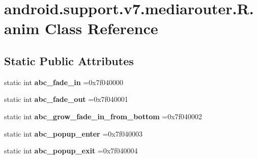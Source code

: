 \hypertarget{classandroid_1_1support_1_1v7_1_1mediarouter_1_1R_1_1anim}{}\section{android.\+support.\+v7.\+mediarouter.\+R.\+anim Class Reference}
\label{classandroid_1_1support_1_1v7_1_1mediarouter_1_1R_1_1anim}
\subsection*{Static Public Attributes}
\begin{DoxyCompactItemize}
\item 
\mbox{\label{classandroid_1_1support_1_1v7_1_1mediarouter_1_1R_1_1anim_ad2e42a8883a370e6cacf5646f5ca963a}} 
static int {\bfseries abc\+\_\+fade\+\_\+in} =0x7f040000
\item 
\mbox{\label{classandroid_1_1support_1_1v7_1_1mediarouter_1_1R_1_1anim_a5cccdc5731a40057ce870b0f9f0d9ac4}} 
static int {\bfseries abc\+\_\+fade\+\_\+out} =0x7f040001
\item 
\mbox{\label{classandroid_1_1support_1_1v7_1_1mediarouter_1_1R_1_1anim_aa69c2db82be247aa2aa32da27296b6b9}} 
static int {\bfseries abc\+\_\+grow\+\_\+fade\+\_\+in\+\_\+from\+\_\+bottom} =0x7f040002
\item 
\mbox{\label{classandroid_1_1support_1_1v7_1_1mediarouter_1_1R_1_1anim_a1c16f4318822b1ebb0319e7a7c702081}} 
static int {\bfseries abc\+\_\+popup\+\_\+enter} =0x7f040003
\item 
\mbox{\label{classandroid_1_1support_1_1v7_1_1mediarouter_1_1R_1_1anim_a04fdd79aeab1cffebaaef6bbfd0ada20}} 
static int {\bfseries abc\+\_\+popup\+\_\+exit} =0x7f040004
\item 
\mbox{\label{classandroid_1_1support_1_1v7_1_1mediarouter_1_1R_1_1anim_a135546231bcdd2cfb97625358558dbf2}} 

\end{DoxyCompactItemize}
